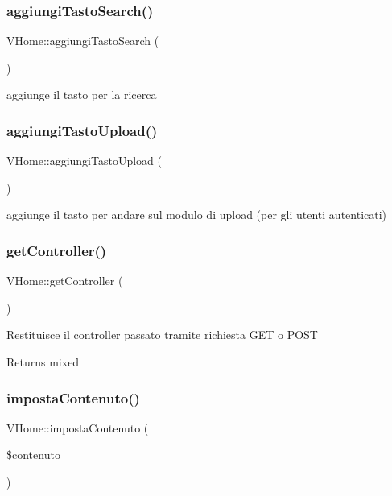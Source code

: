 \subsubsection{\texorpdfstring{aggiungi\+Tasto\+Search()}{aggiungiTastoSearch()}}
{\footnotesize\ttfamily V\+Home\+::aggiungi\+Tasto\+Search (\begin{DoxyParamCaption}{ }\end{DoxyParamCaption})}

aggiunge il tasto per la ricerca \mbox{\label{class_v_home_a94c49a2241c8767f71eb0e20a2ab9c4b}} 
\subsubsection{\texorpdfstring{aggiungi\+Tasto\+Upload()}{aggiungiTastoUpload()}}
{\footnotesize\ttfamily V\+Home\+::aggiungi\+Tasto\+Upload (\begin{DoxyParamCaption}{ }\end{DoxyParamCaption})}

aggiunge il tasto per andare sul modulo di upload (per gli utenti autenticati) \mbox{\label{class_v_home_a6997728b15232ea9c0ed4c142634bcf8}} 
\subsubsection{\texorpdfstring{get\+Controller()}{getController()}}
{\footnotesize\ttfamily V\+Home\+::get\+Controller (\begin{DoxyParamCaption}{ }\end{DoxyParamCaption})}

Restituisce il controller passato tramite richiesta G\+ET o P\+O\+ST

\begin{DoxyReturn}{Returns}
mixed 
\end{DoxyReturn}
\mbox{\label{class_v_home_a56c889c43b21fb05449872dfcd614a85}} 
\subsubsection{\texorpdfstring{imposta\+Contenuto()}{impostaContenuto()}}
{\footnotesize\ttfamily V\+Home\+::imposta\+Contenuto (\begin{DoxyParamCaption}\item[{}]{\$contenuto }\end{DoxyParamCaption})}

